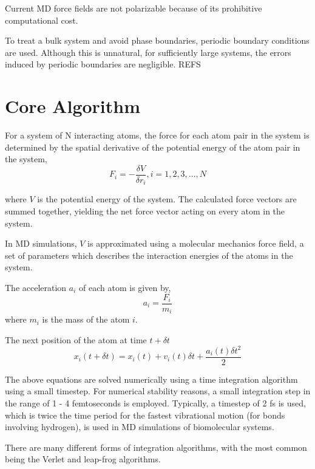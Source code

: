 Current MD force fields are not polarizable because of its prohibitive computational cost.

To treat a bulk system and avoid phase boundaries, periodic boundary conditions are used.  Although this is unnatural, for sufficiently large systems, the errors induced by periodic boundaries are negligible. REFS

\section{Core Algorithm}
For a system of N interacting atoms, the force for each atom pair in the system is determined by the spatial derivative of the potential energy of the atom pair in the system,
\begin{equation}
  F_i = - \frac{\delta V}{\delta r_i}, i = 1,2,3,..., N
\end{equation}

where $V$ is the potential energy of the system. The calculated force vectors are summed together, yielding the net force vector acting on every atom in the system. 

In MD simulations, $V$ is approximated using a molecular mechanics force field, a set of parameters which describes the interaction energies of the atoms in the system.

The acceleration $a_i$ of each atom is given by,
\begin{equation}
a_i = \frac{F_i}{m_i}
\end{equation}
where $m_i$ is the mass of the atom $i$.

The next position of the atom at time $ t + \delta t$
\begin{equation}
x_i(t + \delta t) = x_i(t) + v_i(t)\delta t + \frac{a_i(t)\delta t^2}{2}	
\end{equation}

The above equations are solved numerically using a time integration algorithm using a small timestep. For numerical stability reasons, a small integration step in the range of 1 - 4 femtoseconds is employed. Typically, a timestep of 2 fs is used, which is twice the time period for the fastest vibrational motion (for bonds involving hydrogen), is used in MD simulations of biomolecular systems. %

There are many different forms of integration algorithms, with the most common being the Verlet and leap-frog algorithms. 

